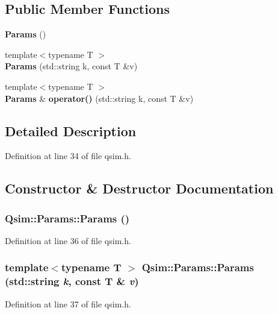 \subsection*{Public Member Functions}
\begin{CompactItemize}
\item 
{\bf Params} ()
\item 
{\footnotesize template$<$typename T $>$ }\\{\bf Params} (std::string k, const T \&v)
\item 
{\footnotesize template$<$typename T $>$ }\\{\bf Params} \& {\bf operator()} (std::string k, const T \&v)
\end{CompactItemize}


\subsection{Detailed Description}


Definition at line 34 of file qsim.h.

\subsection{Constructor \& Destructor Documentation}
\subsubsection[{Params}]{\setlength{\rightskip}{0pt plus 5cm}Qsim::Params::Params ()\hspace{0.3cm}{\tt  [inline]}}\label{classQsim_1_1Params_94d08b6ee367ca175de49b2b1f0dadcf}




Definition at line 36 of file qsim.h.
\subsubsection[{Params}]{\setlength{\rightskip}{0pt plus 5cm}template$<$typename T $>$ Qsim::Params::Params (std::string {\em k}, \/  const T \& {\em v})\hspace{0.3cm}{\tt  [inline]}}\label{classQsim_1_1Params_ffe0fe11640e589d2b6c56f8f42dffa7}




Definition at line 37 of file qsim.h.

